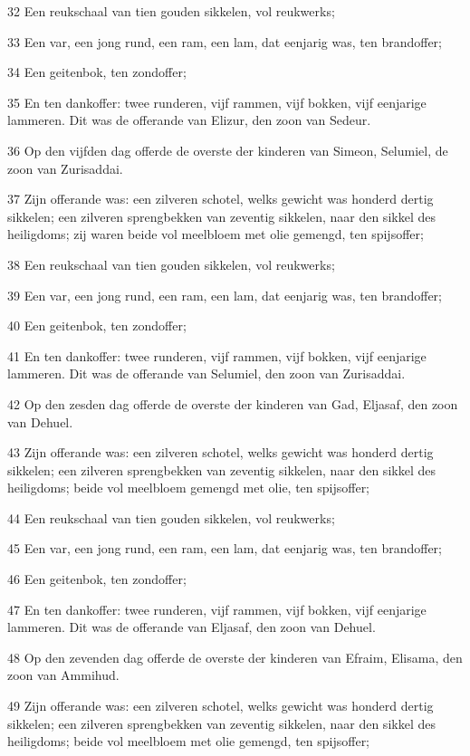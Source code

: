 \par 32 Een reukschaal van tien gouden sikkelen, vol reukwerks;
\par 33 Een var, een jong rund, een ram, een lam, dat eenjarig was, ten brandoffer;
\par 34 Een geitenbok, ten zondoffer;
\par 35 En ten dankoffer: twee runderen, vijf rammen, vijf bokken, vijf eenjarige lammeren. Dit was de offerande van Elizur, den zoon van Sedeur.
\par 36 Op den vijfden dag offerde de overste der kinderen van Simeon, Selumiel, de zoon van Zurisaddai.
\par 37 Zijn offerande was: een zilveren schotel, welks gewicht was honderd dertig sikkelen; een zilveren sprengbekken van zeventig sikkelen, naar den sikkel des heiligdoms; zij waren beide vol meelbloem met olie gemengd, ten spijsoffer;
\par 38 Een reukschaal van tien gouden sikkelen, vol reukwerks;
\par 39 Een var, een jong rund, een ram, een lam, dat eenjarig was, ten brandoffer;
\par 40 Een geitenbok, ten zondoffer;
\par 41 En ten dankoffer: twee runderen, vijf rammen, vijf bokken, vijf eenjarige lammeren. Dit was de offerande van Selumiel, den zoon van Zurisaddai.
\par 42 Op den zesden dag offerde de overste der kinderen van Gad, Eljasaf, den zoon van Dehuel.
\par 43 Zijn offerande was: een zilveren schotel, welks gewicht was honderd dertig sikkelen; een zilveren sprengbekken van zeventig sikkelen, naar den sikkel des heiligdoms; beide vol meelbloem gemengd met olie, ten spijsoffer;
\par 44 Een reukschaal van tien gouden sikkelen, vol reukwerks;
\par 45 Een var, een jong rund, een ram, een lam, dat eenjarig was, ten brandoffer;
\par 46 Een geitenbok, ten zondoffer;
\par 47 En ten dankoffer: twee runderen, vijf rammen, vijf bokken, vijf eenjarige lammeren. Dit was de offerande van Eljasaf, den zoon van Dehuel.
\par 48 Op den zevenden dag offerde de overste der kinderen van Efraim, Elisama, den zoon van Ammihud.
\par 49 Zijn offerande was: een zilveren schotel, welks gewicht was honderd dertig sikkelen; een zilveren sprengbekken van zeventig sikkelen, naar den sikkel des heiligdoms; beide vol meelbloem met olie gemengd, ten spijsoffer;
